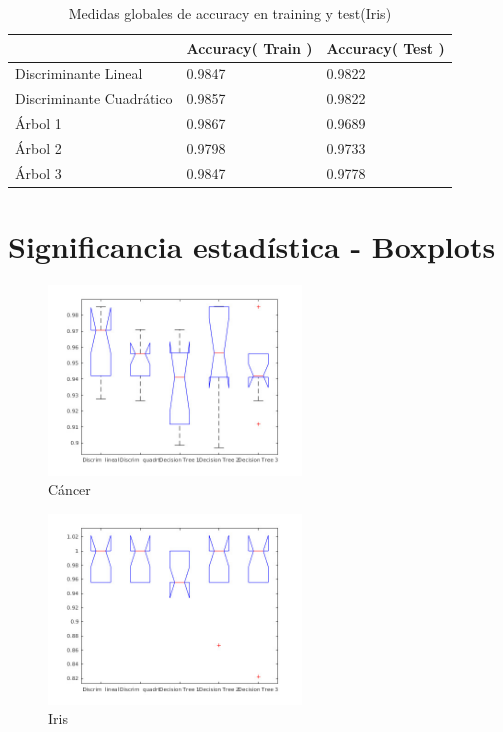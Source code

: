 \documentclass[a4paper,openwrite,12pt]{article}
\begin{document}
\begin{table}[H]
\centering
\begin{tabular}{@{}lll@{}}
\toprule
                         & Accuracy( Train ) & Accuracy( Test ) \\ \midrule
Discriminante Lineal     & 0.9847            & 0.9822           \\
Discriminante Cuadrático & 0.9857            & 0.9822           \\
Árbol 1                  & 0.9867            & 0.9689           \\
Árbol 2                  & 0.9798            & 0.9733           \\
Árbol 3                  & 0.9847            & 0.9778          
\end{tabular}
\caption{Medidas globales de accuracy en training y test(Iris)}
\label{tab:global_iris}
\end{table}
\newpage
\section{Significancia estadística - Boxplots}

\begin{figure}[H]
\centering
\includegraphics[width=0.6\textwidth]{img/box_cancer.jpg}
\caption{Cáncer}
\end{figure}

\begin{figure}[H]
\centering
\includegraphics[width=0.6\textwidth]{img/box_iris.jpg}
\caption{Iris}
\end{figure}

\newpage
\listoftables
\end{document}
